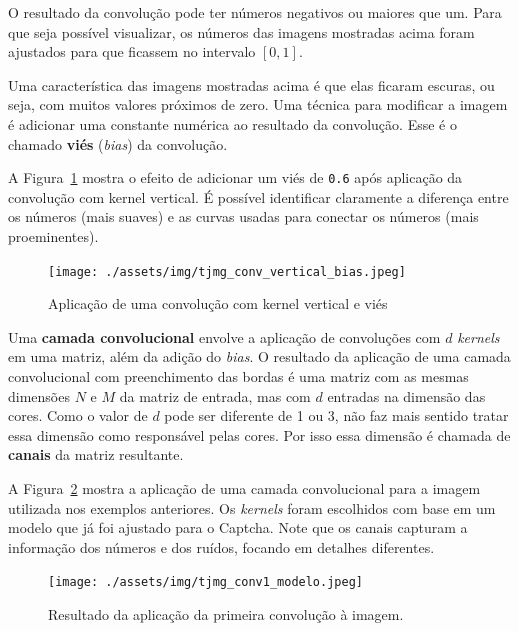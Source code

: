 \documentclass[12pt,twoside,brazilian]{book}
\begin{document}
O resultado da convolução pode ter números negativos ou maiores que um.
Para que seja possível visualizar, os números das imagens mostradas
acima foram ajustados para que ficassem no intervalo \([0,1]\).

Uma característica das imagens mostradas acima é que elas ficaram
escuras, ou seja, com muitos valores próximos de zero. Uma técnica para
modificar a imagem é adicionar uma constante numérica ao resultado da
convolução. Esse é o chamado \textbf{viés} (\emph{bias}) da convolução.

A Figura~\ref{fig-tjmg-exemplo-conv-vertical-bias} mostra o efeito de
adicionar um viés de \texttt{0.6} após aplicação da convolução com
kernel vertical. É possível identificar claramente a diferença entre os
números (mais suaves) e as curvas usadas para conectar os números (mais
proeminentes).

\begin{figure}

{\centering \texttt{[image: ./assets/img/tjmg\_conv\_vertical\_bias.jpeg]}

}

\caption{\label{fig-tjmg-exemplo-conv-vertical-bias}Aplicação de uma
convolução com kernel vertical e viés}

\end{figure}

Uma \textbf{camada convolucional} envolve a aplicação de convoluções com
\(d\) \emph{kernels} em uma matriz, além da adição do \emph{bias}. O
resultado da aplicação de uma camada convolucional com preenchimento das
bordas é uma matriz com as mesmas dimensões \(N\) e \(M\) da matriz de
entrada, mas com \(d\) entradas na dimensão das cores. Como o valor de
\(d\) pode ser diferente de 1 ou 3, não faz mais sentido tratar essa
dimensão como responsável pelas cores. Por isso essa dimensão é chamada
de \textbf{canais} da matriz resultante.

A Figura~\ref{fig-tjmg-exemplo-camada-conv} mostra a aplicação de uma
camada convolucional para a imagem utilizada nos exemplos anteriores. Os
\emph{kernels} foram escolhidos com base em um modelo que já foi
ajustado para o Captcha. Note que os canais capturam a informação dos
números e dos ruídos, focando em detalhes diferentes.

\begin{figure}

{\centering \texttt{[image: ./assets/img/tjmg\_conv1\_modelo.jpeg]}

}

\caption{\label{fig-tjmg-exemplo-camada-conv}Resultado da aplicação da
primeira convolução à imagem.}

\end{figure}
\end{document}
